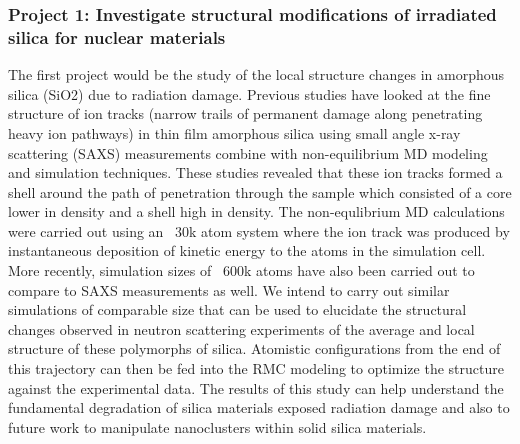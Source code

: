 \subsubsection*{Project 1: Investigate structural modifications of irradiated silica for nuclear materials}\label{lang}

The first project would be the study of the local structure changes in amorphous silica (SiO2) due to radiation damage. Previous studies have looked at the fine structure of ion tracks (narrow trails of permanent damage along penetrating heavy ion pathways) in thin film amorphous silica using small angle x-ray scattering (SAXS) measurements combine with non-equilibrium MD modeling and simulation techniques. These studies revealed that these ion tracks formed a shell around the path of penetration through the sample which consisted of a core lower in density and a shell high in density. The non-equlibrium MD calculations were carried out using an ~30k atom system where the ion track was produced by instantaneous deposition of kinetic energy to the atoms in the simulation cell. More recently, simulation sizes of ~600k atoms have also been carried out to compare to SAXS measurements as well. We intend to carry out similar simulations of comparable size that can be used to elucidate the structural changes observed in neutron scattering experiments of the average and local structure of these polymorphs of silica. Atomistic configurations from the end of this trajectory can then be fed into the RMC modeling to optimize the structure against the experimental data. The results of this study can help understand the fundamental degradation of silica materials exposed radiation damage and also to future work to manipulate nanoclusters within solid silica materials. 
